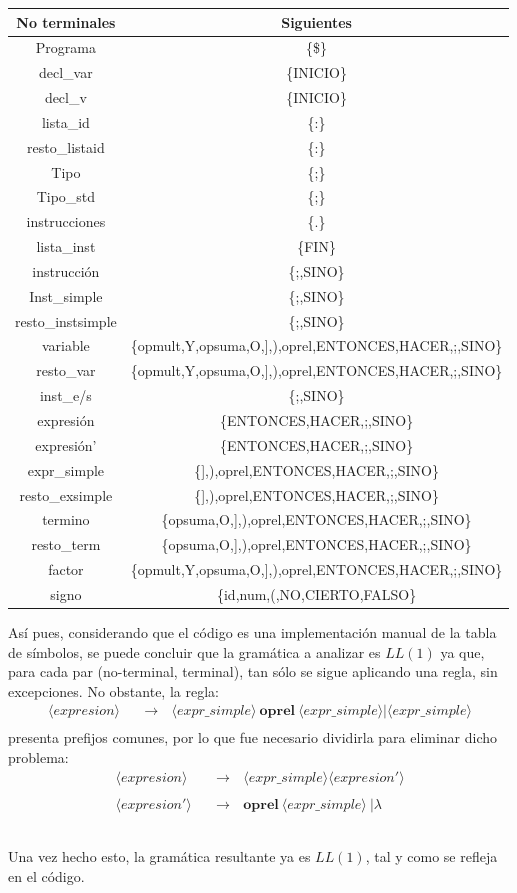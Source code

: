 \documentclass[11pt]{article}
\newcommand{\nt}[1]{\langle#1\rangle}
\newcommand{\regla}[2]{\nt{#1} \ \ \ &\rightarrow \ \ \ #2 \\}
\begin{document}
\begin{tabular}{|c|c|}
	\hline
	\textbf{No terminales} & \textbf{Siguientes} \\ \hline
	Programa & \{\$\} \\ \hline
	decl\_var & \{INICIO\} \\ \hline
	decl\_v & \{INICIO\} \\ \hline
	lista\_id & \{:\} \\ \hline
	resto\_listaid & \{:\} \\ \hline
	Tipo & \{;\} \\ \hline
	Tipo\_std & \{;\} \\ \hline
	instrucciones & \{.\} \\ \hline
	lista\_inst & \{FIN\} \\ \hline
	instrucción & \{;,SINO\} \\ \hline
	Inst\_simple & \{;,SINO\} \\ \hline
	resto\_instsimple & \{;,SINO\} \\ \hline
	variable & \{opmult,Y,opsuma,O,],),oprel,ENTONCES,HACER,;,SINO\} \\ \hline
	resto\_var & \{opmult,Y,opsuma,O,],),oprel,ENTONCES,HACER,;,SINO\} \\ \hline
	inst\_e/s & \{;,SINO\} \\ \hline
	expresión & \{ENTONCES,HACER,;,SINO\} \\ \hline
	expresión' & \{ENTONCES,HACER,;,SINO\} \\ \hline
	expr\_simple & \{],),oprel,ENTONCES,HACER,;,SINO\} \\ \hline
	resto\_exsimple & \{],),oprel,ENTONCES,HACER,;,SINO\} \\ \hline
	termino & \{opsuma,O,],),oprel,ENTONCES,HACER,;,SINO\} \\ \hline
	resto\_term & \{opsuma,O,],),oprel,ENTONCES,HACER,;,SINO\} \\ \hline
	factor & \{opmult,Y,opsuma,O,],),oprel,ENTONCES,HACER,;,SINO\} \\ \hline
	signo & \{id,num,(,NO,CIERTO,FALSO\} \\ \hline
\end{tabular}
\newpage
Así pues, considerando que el código es una implementación manual de la tabla de símbolos, se puede concluir que la gramática a analizar es $LL(1)$ ya que, para cada par (no-terminal, terminal), tan sólo se sigue aplicando una regla, sin excepciones. No obstante, la regla: \begin{align*}
\regla{expresion}{\nt{expr\_simple} \ \textbf{oprel} \ \nt{expr\_simple} | \nt{expr\_simple}}
\end{align*}
presenta prefijos comunes, por lo que fue necesario dividirla para eliminar dicho problema: \begin{align*}
\regla{expresion}{\nt{expr\_simple} \nt{expresion'}} \\
\regla{expresion'}{\textbf{oprel} \ \nt{expr\_simple} \ | \lambda} \\
\end{align*} \\
Una vez hecho esto, la gramática resultante ya es $LL(1)$, tal y como se refleja en el código.
\end{document}
